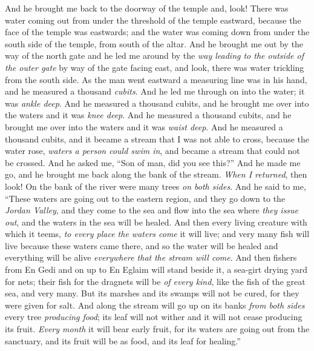 \begin{biblechapter} %
 And he brought me back to the doorway of the temple and, look! There was water coming out from under the threshold of the temple eastward, because the face of the temple was eastwards; and the water was coming down from under the south side of the temple, from south of the altar.
\verse And he brought me out by the way of the north gate and he led me around by the \textit{way leading to the outside of the outer gate} by way of the gate facing east, and look, there was water trickling from the south side.
\verse As the man went eastward a measuring line was in his hand, and he measured a thousand \textit{cubits}. And he led me through on into the water; it was \textit{ankle deep}.
\verse And he measured a thousand cubits, and he brought me over into the waters and it was \textit{knee deep}. And he measured a thousand cubits, and he brought me over into the waters and it was \textit{waist deep}.
\verse And he measured a thousand cubits, and it became a stream that I was not able to cross, because the water rose, \textit{waters a person could swim in}, and became a stream that could not be crossed.
\verse And he asked me, “Son of man, did you see this?” And he made me go, and he brought me back along the bank of the stream.
\verse \textit{When I returned}, then look! On the bank of the river were many trees \textit{on both sides}.
\verse And he said to me, “These waters are going out to the eastern region, and they go down to the \textit{Jordan Valley}, and they come to the sea and flow into the sea where \textit{they issue out}, and the waters in the sea will be healed.
\verse And then every living creature with which it teems, \textit{to every place the waters come} it will live; and very many fish will live because these waters came there, and so the water will be healed and everything will be alive \textit{everywhere that} \textit{the stream will come}.
\verse And then fishers from En Gedi and on up to En Eglaim will stand beside it, a sea-girt drying yard for nets; their fish for the dragnets will be \textit{of every kind}, like the fish of the great sea, and very many.
\verse But its marshes and its swamps will not be cured, for they were given for salt.
\verse And along the stream will go up on its banks \textit{from both sides} every tree \textit{producing food}; its leaf will not wither and it will not cease producing its fruit. \textit{Every month} it will bear early fruit, for its waters are going out from the sanctuary, and its fruit will be as food, and its leaf for healing.”

\end{biblechapter}
